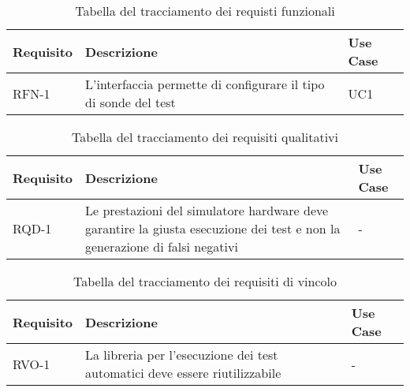 \newpage

\begin{table}%
\caption{Tabella del tracciamento dei requisti funzionali}
\label{tab:requisiti-funzionali}
\begin{tabularx}{\textwidth}{lXl}
\hline\hline
\textbf{Requisito} & \textbf{Descrizione} & \textbf{Use Case}\\
\hline
RFN-1     & L'interfaccia permette di configurare il tipo di sonde del test & UC1 \\
\hline
\end{tabularx}
\end{table}%

\begin{table}%
\caption{Tabella del tracciamento dei requisiti qualitativi}
\label{tab:requisiti-qualitativi}
\begin{tabularx}{\textwidth}{lXl}
\hline\hline
\textbf{Requisito} & \textbf{Descrizione} & \textbf{Use Case}\\
\hline
RQD-1    & Le prestazioni del simulatore hardware deve garantire la giusta esecuzione dei test e non la generazione di falsi negativi & - \\
\hline
\end{tabularx}
\end{table}%

\begin{table}%
\caption{Tabella del tracciamento dei requisiti di vincolo}
\label{tab:requisiti-vincolo}
\begin{tabularx}{\textwidth}{lXl}
\hline\hline
\textbf{Requisito} & \textbf{Descrizione} & \textbf{Use Case}\\
\hline
RVO-1    & La libreria per l'esecuzione dei test automatici deve essere riutilizzabile & - \\
\hline
\end{tabularx}
\end{table}%